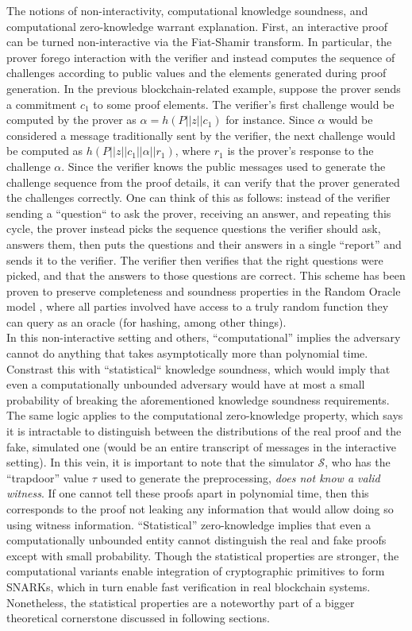 \noindent The notions of non-interactivity, computational knowledge soundness, and computational zero-knowledge warrant explanation. First, an interactive proof can be turned non-interactive via the Fiat-Shamir transform. In particular, the prover forego interaction with the verifier and instead computes the sequence of challenges according to public values and the elements generated during proof generation. In the previous blockchain-related example, suppose the prover sends a commitment $c_1$ to some proof elements. The verifier's first challenge would be computed by the prover as $\alpha = h(P || z || c_1)$ for instance. Since $\alpha$ would be considered a message traditionally sent by the verifier, the next challenge would be computed as $h(P || z || c_1 || \alpha || r_1)$, where $r_1$ is the prover's response to the challenge $\alpha$. Since the verifier knows the public messages used to generate the challenge sequence from the proof details, it can verify that the prover generated the challenges correctly. One can think of this as follows: instead of the verifier sending a ``question`` to ask the prover, receiving an answer, and repeating this cycle, the prover instead picks the sequence questions the verifier should ask, answers them, then puts the questions and their answers in a single ``report'' and sends it to the verifier. The verifier then verifies that the right questions were picked, and that the answers to those questions are correct. This scheme has been proven to preserve completeness and soundness properties in the Random Oracle model \cite{rom}, where all parties involved have access to a truly random function they can query as an oracle (for hashing, among other things).\\

\noindent In this non-interactive setting and others, ``computational'' implies the adversary cannot do anything that takes asymptotically more than polynomial time. Constrast this with ``statistical`` knowledge soundness, which would imply that even a computationally unbounded adversary would have at most a small probability of breaking the aforementioned knowledge soundness requirements. The same logic applies to the computational zero-knowledge property, which says it is intractable to distinguish between the distributions of the real proof and the fake, simulated one (would be an entire transcript of messages in the interactive setting). In this vein, it is important to note that the simulator $\mathcal{S}$, who has the ``trapdoor'' value $\tau$ used to generate the preprocessing, \textit{does not know a valid witness}. If one cannot tell these proofs apart in polynomial time, then this corresponds to the proof not leaking any information that would allow doing so using witness information. ``Statistical'' zero-knowledge implies that even a computationally unbounded entity cannot distinguish the real and fake proofs except with small probability. Though the statistical properties are stronger, the computational variants enable integration of cryptographic primitives to form SNARKs, which in turn enable fast verification in real blockchain systems. Nonetheless, the statistical properties are a noteworthy part of a bigger theoretical cornerstone discussed in following sections.

